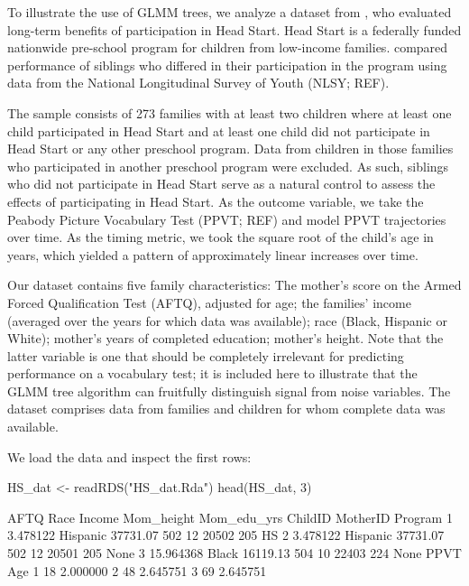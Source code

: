 \documentclass[doc,floatsintext,natbib]{apa7}
\begin{document}
To illustrate the use of GLMM trees, we analyze a dataset from \cite{Demi09}, who evaluated long-term benefits of participation in Head Start. Head Start is a federally funded nationwide pre-school program for children from low-income families. \cite{Demi09} compared performance of siblings who differed in their participation in the program using data from the National Longitudinal Survey of Youth (NLSY; REF). 

The sample consists of 273 families with at least two children where at least one child participated in Head Start and at least one child did not participate in Head Start or any other preschool program. Data from children in those families who participated in another preschool program were excluded. As such, siblings who did not participate in Head Start serve as a natural control to assess the effects of participating in Head Start. As the outcome variable, we take the Peabody Picture Vocabulary Test (PPVT; REF) and model PPVT trajectories over time. As the timing metric, we took the square root of the child's age in years, which yielded a pattern of approximately linear increases over time.

Our dataset contains five family characteristics: The mother's score on the Armed Forced Qualification Test (AFTQ), adjusted for age; the families' income (averaged over the years for which data was available); race (Black, Hispanic or White); mother's years of completed education; mother's height. Note that the latter variable is one that should be completely irrelevant for predicting performance on a vocabulary test; it is included here to illustrate that the GLMM tree algorithm can fruitfully distinguish signal from noise variables. The dataset comprises data from families and children for whom complete data was available. 

We load the data and inspect the first rows:

\begin{Schunk}
\begin{Sinput}
 HS_dat <- readRDS("HS_dat.Rda")
 head(HS_dat, 3)
\end{Sinput}
\begin{Soutput}
       AFTQ     Race   Income Mom_height Mom_edu_yrs ChildID MotherID Program
1  3.478122 Hispanic 37731.07        502          12   20502      205      HS
2  3.478122 Hispanic 37731.07        502          12   20501      205    None
3 15.964368    Black 16119.13        504          10   22403      224    None
  PPVT      Age
1   18 2.000000
2   48 2.645751
3   69 2.645751
\end{Soutput}
\end{Schunk}
\end{document}

